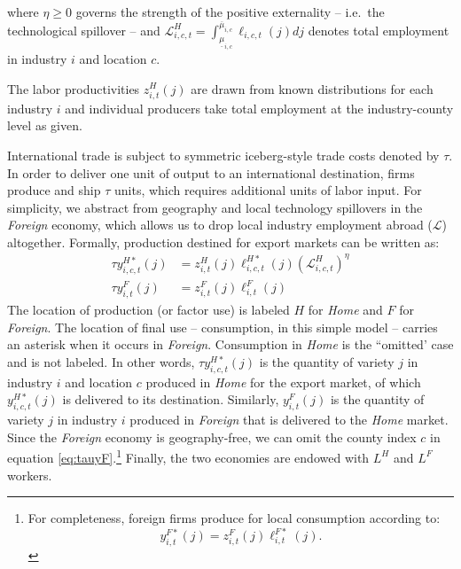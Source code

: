 \documentclass[onehalfspacing,11pt]{article}
\begin{document}
where $\eta \geq 0$ governs the strength of the positive externality -- i.e.~the technological spillover -- and $\mathcal{L}_{i,c,t}^H = \int_{\underline{\mu}_{i,c}}^{\overline{\mu}_{i,c}} \ell_{i,c,t}(j) dj$ denotes total employment in industry $i$ and location $c$. 

The labor productivities $z_{i,t}^H(j)$ are drawn from known distributions for each industry $i$ and individual producers take total employment at the industry-county level as given.

International trade is subject to symmetric iceberg-style trade costs denoted by $\tau$. In order to deliver one unit of output to an international destination, firms produce and ship $\tau$ units, which requires additional units of labor input. For simplicity, we abstract from geography and local technology spillovers in the {\it Foreign} economy, which allows us to drop local industry employment abroad ($\mathcal{L}$) altogether. Formally, production destined for export markets can be written as:
\begin{align}
\label{}
\tau y_{i,c,t}^{H*}(j) & = z_{i,t}^H(j) \ell_{i,c,t}^{H*}(j) \left( \mathcal{L}_{i,c,t}^H \right)^\eta\\
\tau y_{i,t}^{F}(j) & = z_{i,t}^F(j) \ell_{i,t}^{F}(j) \label{eq:tauyF}
\end{align}
The location of production (or factor use) is labeled $H$ for {\it Home} and $F$ for {\it Foreign}. The location of final use -- consumption, in this simple model -- carries an asterisk when it occurs in {\it Foreign}. Consumption in {\it Home} is the ``omitted' case and is not labeled. In other words, $\tau y_{i,c,t}^{H*}(j)$ is the quantity of variety $j$ in industry $i$ and location $c$ produced in {\it Home} for the export market, of which $y_{i,c,t}^{H*}(j)$ is delivered to its destination. Similarly, $y_{i,t}^{F}(j)$ is the quantity of variety $j$ in industry $i$ produced in {\it Foreign} that is delivered to the {\it Home} market. Since the {\it Foreign} economy is geography-free, we can omit the county index $c$ in equation \eqref{eq:tauyF}.\footnote{For completeness, foreign firms produce for local consumption according to:
\begin{equation}
\label{ }
y_{i,t}^{F*}(j) = z_{i,t}^F(j) \ell_{i,t}^{F*}(j) .
\end{equation}}
Finally, the two economies are endowed with $L^H$ and $L^F$ workers.
\end{document}
